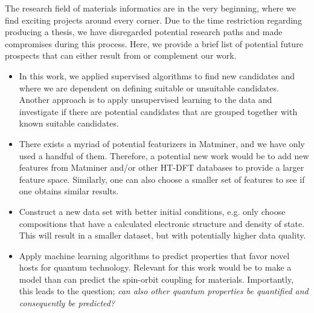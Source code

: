 The research field of materials informatics are in the very beginning, where we find exciting projects around every corner.
Due to the time restriction regarding producing a thesis, we have  disregarded potential research paths and made compromises during this process. Here, we provide a brief list of potential future prospects that can either result from or complement our work.
\begin{itemize}
  \item In this work, we applied supervised algorithms to find new candidates and where we are dependent on defining suitable or unsuitable candidates. Another approach is to apply unsupervised learning to the data and investigate if there are potential candidates that are grouped together with known suitable candidates.
  \item There exists a myriad of potential featurizers in Matminer, and we have only used a handful of them. Therefore, a potential new work would be to add new features from Matminer and/or other HT-DFT databases to provide a larger feature space. Similarly, one can also choose a smaller set of features to see if one obtains similar results.
  \item Construct a new data set with better initial conditions, e.g. only choose compositions that have a calculated electronic structure and density of state. This will result in a smaller dataset, but with potentially higher data quality.
  \item Apply machine learning algorithms to predict properties that favor novel hosts for quantum technology. Relevant for this work would be to make a model than can predict the spin-orbit coupling for materials. Importantly, this leads to the question; \textit{can also other quantum properties be quantified and consequently be predicted?}
\end{itemize}


